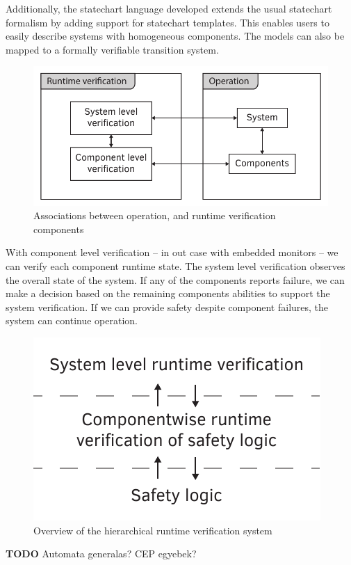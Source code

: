 Additionally, the statechart language developed extends the usual statechart formalism by adding support for statechart templates. This enables users to easily describe systems with homogeneous components. The models can also be mapped to a formally verifiable transition system.

\begin{figure}[H]
	\centering
	\includegraphics[width=0.65\linewidth]{include/figures/chapter_1/rv_overview}
	\caption{Associations between operation, and runtime verification components}
	\label{fig:intro:concept_component}
\end{figure}

With component level verification -- in out case with embedded monitors -- we can verify each component runtime state. The system level verification observes the overall state of the system. If any of the components reports failure, we can make a decision based on the remaining components abilities to support the system verification. If we can provide safety despite component failures, the system can continue operation.

\begin{figure}[h]
	\centering
	\includegraphics[width=0.4\linewidth]{include/figures/chapter_6/overview_1}
	\caption{Overview of the hierarchical runtime verification system}
	\label{fig:case_study:fov}
\end{figure}

\textbf{TODO}
Automata generalas?
CEP egyebek?